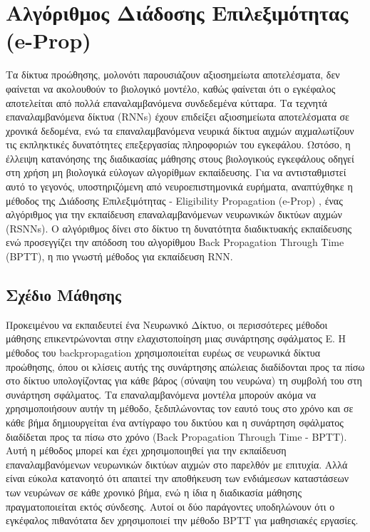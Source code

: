 \documentclass[12pt]{report}
\begin{document}
\section{Αλγόριθμος Διάδοσης Επιλεξιμότητας \textlatin{(e-Prop)}}

Τα δίκτυα προώθησης, μολονότι παρουσιάζουν αξιοσημείωτα αποτελέσματα, δεν φαίνεται να ακολουθούν το βιολογικό μοντέλο, καθώς φαίνεται ότι ο εγκέφαλος αποτελείται από πολλά επαναλαμβανόμενα συνδεδεμένα κύτταρα. Τα τεχνητά επαναλαμβανόμενα δίκτυα \textlatin{(RNNs)} έχουν επιδείξει αξιοσημείωτα αποτελέσματα σε χρονικά δεδομένα, ενώ τα επαναλαμβανόμενα νευρικά δίκτυα αιχμών αιχμαλωτίζουν τις εκπληκτικές δυνατότητες επεξεργασίας πληροφοριών του εγκεφάλου. Ωστόσο, η έλλειψη κατανόησης της διαδικασίας μάθησης στους βιολογικούς εγκεφάλους οδηγεί στη χρήση μη βιολογικά εύλογων αλγορίθμων εκπαίδευσης. Για να αντισταθμιστεί αυτό το γεγονός, υποστηριζόμενη από νευροεπιστημονικά ευρήματα, αναπτύχθηκε η μέθοδος της Διάδοσης Επιλεξιμότητας - \textlatin{Eligibility Propagation (e-Prop)} \cite{Bellec2020}, ένας αλγόριθμος για την εκπαίδευση επαναλαμβανόμενων νευρωνικών δικτύων αιχμών \textlatin{(RSNNs)}. Ο αλγόριθμος δίνει στο δίκτυο τη δυνατότητα διαδικτυακής εκπαίδευσης ενώ προσεγγίζει την απόδοση του αλγορίθμου \textlatin{Back Propagation Through Time (BPTT)}, η πιο γνωστή μέθοδος για εκπαίδευση \textlatin{RNN}.

\subsection{Σχέδιο Μάθησης}
Προκειμένου να εκπαιδευτεί ένα Νευρωνικό Δίκτυο, οι περισσότερες μέθοδοι μάθησης επικεντρώνονται στην ελαχιστοποίηση μιας συνάρτησης σφάλματος Ε. Η μέθοδος του \textlatin{backpropagation} χρησιμοποιείται ευρέως σε νευρωνικά δίκτυα προώθησης, όπου οι κλίσεις αυτής της συνάρτησης απώλειας διαδίδονται προς τα πίσω στο δίκτυο υπολογίζοντας για κάθε βάρος (σύναψη του νευρώνα) τη συμβολή του στη συνάρτηση σφάλματος. Τα επαναλαμβανόμενα μοντέλα μπορούν ακόμα να χρησιμοποιήσουν αυτήν τη μέθοδο, ξεδιπλώνοντας τον εαυτό τους στο χρόνο και σε κάθε βήμα δημιουργείται ένα αντίγραφο του δικτύου και η συνάρτηση σφάλματος διαδίδεται προς τα πίσω στο χρόνο \textlatin{(Back Propagation Through Time - BPTT)}. Αυτή η μέθοδος μπορεί και έχει χρησιμοποιηθεί για την εκπαίδευση επαναλαμβανόμενων νευρωνικών δικτύων αιχμών στο παρελθόν με επιτυχία. Αλλά είναι εύκολα κατανοητό ότι απαιτεί την αποθήκευση των ενδιάμεσων καταστάσεων των νευρώνων σε κάθε χρονικό βήμα, ενώ η ίδια η διαδικασία μάθησης πραγματοποιείται εκτός σύνδεσης. Αυτοί οι δύο παράγοντες υποδηλώνουν ότι ο εγκέφαλος πιθανότατα δεν χρησιμοποιεί την μέθοδο \textlatin{BPTT} για μαθησιακές εργασίες.
\end{document}
